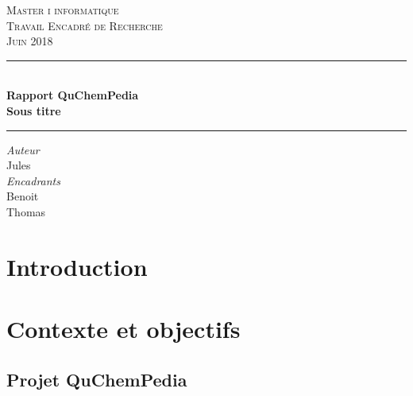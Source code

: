 \documentclass{report}
\begin{document}
\begin{titlepage}
	\centering
	
    \vspace*{1.2 cm}
    
   	\textsc{\LARGE Master i informatique\\Travail Encadré de Recherche\\[0.3cm]\large Juin 2018}

	\vspace{2.2cm}
    
    
	\rule{\linewidth }{0.2 mm} \\[0.15 cm]
    {\LARGE \textbf{Rapport QuChemPedia}\\[0.2cm] \large
		\textbf{Sous titre}}\\
	\rule{\linewidth}{0.2 mm}
       \vspace*{0.1 cm}
	
	\begin{center}
	\vspace{0.3cm}
	
	\emph{Auteur}\\
	\vspace{0.1cm}
	Jules \\ 
	
	
	\vspace{0.5cm}
	\emph{Encadrants}\\
	\vspace{0.1cm}
	Benoit \\
	Thomas 
	\end{center}		
	
	\vspace{1.0cm}


    
    
\end{titlepage}


\tableofcontents

\chapter*{Introduction}
	

\chapter{Contexte et objectifs}
	\section{Projet QuChemPedia}
		
\end{document}
